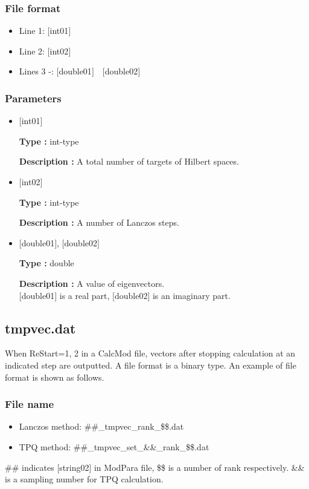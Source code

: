 \subsubsection{File format}
 \begin{itemize}
   \item  Line 1: $[$int01$]$
   \item  Line 2: $[$int02$]$
   \item  Lines 3 -: $[$double01$]$~~$[$double02$]$
  \end{itemize}
  
\subsubsection{Parameters}
 \begin{itemize}

  \item  $[$int01$]$

 {\bf Type :} int-type

{\bf Description :}  A total number of targets of Hilbert spaces.

  \item  $[$int02$]$

 {\bf Type :} int-type

{\bf Description :}  { A number of Lanczos steps.}

 \item  $[$double01$]$, $[$double02$]$

 {\bf Type :} double 

{\bf Description :} A value of eigenvectors.\\
$[$double01$]$ is a real part, $[$double02$]$ is an imaginary part.\\

 \end{itemize}

\newpage
\subsection{{tmpvec.dat}}
\label{Subsec:restart}
When ReStart=1, 2 in a CalcMod file, vectors after stopping calculation at an indicated step are outputted. A file format is a binary type. 
An example of file format is shown as follows.

\subsubsection{File name}
\begin{itemize}
   \item{Lanczos method: \#\#\_tmpvec\_rank\_\$\$.dat}
   \item{TPQ method: \#\#\_tmpvec\_set\_\&\&\_rank\_\$\$.dat}   
\end{itemize}
  \#\# indicates [string02] in ModPara file, \$\$ is a number of rank respectively. \&\& is a sampling number for TPQ calculation. 

